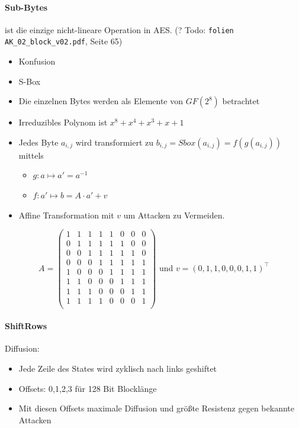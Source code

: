 \paragraph{Sub-Bytes} ist die einzige nicht-lineare Operation in AES. (? Todo: \verb|folien AK_02_block_v02.pdf|, Seite 65)

\begin{itemize}
    \item Konfusion
    \item S-Box 
    \item Die einzelnen Bytes werden als Elemente von $GF(2^8)$ betrachtet
    \item Irreduzibles Polynom ist $x^8 + x^4 + x^3 + x + 1$
    \item Jedes Byte $a_{i,j}$ wird transformiert zu $b_{i,j} = Sbox(a_{i, j}) = f(g(a_{i,j}))$ mittels 
    \begin{itemize}
        \item $g: a \mapsto a' = a^{-1}$
        \item $f: a' \mapsto b = A\cdot a' + v$
    \end{itemize}
    \item Affine Transformation mit $v$ um Attacken zu Vermeiden. 
\end{itemize}

\begin{equation*}
    A = \begin{pmatrix}
        1 & 1 & 1 & 1 & 1 & 0 & 0 & 0\\
        0 & 1 & 1 & 1 & 1 & 1 & 0 & 0\\
        0 & 0 & 1 & 1 & 1 & 1 & 1 & 0\\
        0 & 0 & 0 & 1 & 1 & 1 & 1 & 1\\
        1 & 0 & 0 & 0 & 1 & 1 & 1 & 1\\
        1 & 1 & 0 & 0 & 0 & 1 & 1 & 1\\
        1 & 1 & 1 & 0 & 0 & 0 & 1 & 1\\
        1 & 1 & 1 & 1 & 0 & 0 & 0 & 1\\
\end{pmatrix} \text{ und } v = (0,1,1,0,0,0,1,1)^\top
\end{equation*}

\paragraph{ShiftRows}

Diffusion:
\begin{itemize}
    \item Jede Zeile des States wird zyklisch nach links geshiftet
    \item Offsets: 0,1,2,3 für 128 Bit Blocklänge
    \item Mit diesen Offsets maximale Diffusion und größte Resistenz gegen bekannte Attacken
\end{itemize}

